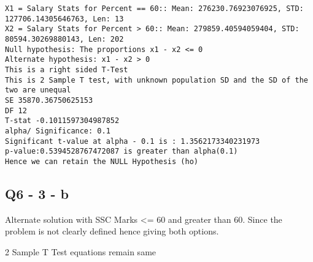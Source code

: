 \documentclass[11pt]{article}
\begin{document}
    \begin{Verbatim}[commandchars=\\\{\}]
X1 = Salary Stats for Percent == 60:: Mean: 276230.76923076925, STD: 127706.14305646763, Len: 13
X2 = Salary Stats for Percent > 60:: Mean: 279859.40594059404, STD: 80594.30269880143, Len: 202
Null hypothesis: The proportions x1 - x2 <= 0
Alternate hypothesis: x1 - x2 > 0
This is a right sided T-Test
This is 2 Sample T test, with unknown population SD and the SD of the two are unequal
SE 35870.36750625153
DF 12
T-stat -0.1011597304987852
alpha/ Significance: 0.1
Significant t-value at alpha - 0.1 is : 1.3562173340231973
p-value:0.5394528767472087 is greater than alpha(0.1)
Hence we can retain the NULL Hypothesis (ho)

    \end{Verbatim}

    \subsection{Q6 - 3 - b}\label{q6---3---b}

Alternate solution with SSC Marks \textless{}= 60 and greater than 60.
Since the problem is not clearly defined hence giving both options.

2 Sample T Test equations remain same
\end{document}
